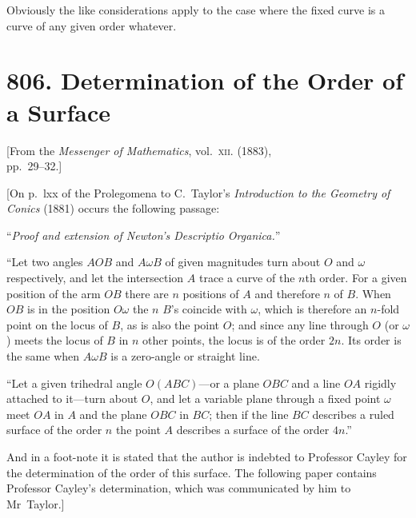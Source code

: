 \documentclass[11pt,a4paper]{article}
\theoremstyle{plain}
\theoremstyle{definition}
\theoremstyle{remark}
\begin{document}
Obviously the like considerations apply to the case where the fixed curve is a curve of any given order whatever.


\newpage
\section*{806. Determination of the Order of a Surface}

\begin{center}
\small[From the \textit{Messenger of Mathematics}, vol.~\textsc{xii}. (1883),\\
pp.~29--32.]
\end{center}

\bigskip

[On p.~lxx of the Prolegomena to C.~Taylor's \textit{Introduction to the Geometry of Conics} (1881) occurs the following passage:

``\textit{Proof and extension of Newton's Descriptio Organica.}''

``Let two angles $AOB$ and $A\omega B$ of given magnitudes turn about $O$ and $\omega$ respectively, and let the intersection $A$ trace a curve of the $n$th order. For a given position of the arm $OB$ there are $n$ positions of $A$ and therefore $n$ of $B$. When $OB$ is in the position $O\omega$ the $n$ $B$'s coincide with $\omega$, which is therefore an $n$-fold point on the locus of $B$, as is also the point $O$; and since any line through $O$ (or $\omega$) meets the locus of $B$ in $n$ other points, the locus is of the order $2n$. Its order is the same when $A\omega B$ is a zero-angle or straight line.

``Let a given trihedral angle $O(ABC)$---or a plane $OBC$ and a line $OA$ rigidly attached to it---turn about $O$, and let a variable plane through a fixed point $\omega$ meet $OA$ in $A$ and the plane $OBC$ in $BC$; then if the line $BC$ describes a ruled surface of the order $n$ the point $A$ describes a surface of the order $4n$.''

And in a foot-note it is stated that the author is indebted to Professor Cayley for the determination of the order of this surface. The following paper contains Professor Cayley's determination, which was communicated by him to Mr~Taylor.]

\medskip
\end{document}
